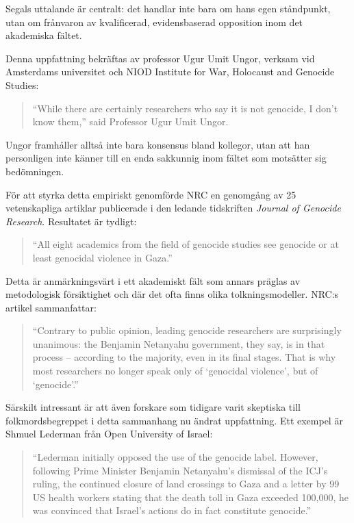 Segals uttalande är centralt: det handlar inte bara om hans egen ståndpunkt, utan om frånvaron av kvalificerad, evidensbaserad opposition inom det akademiska fältet.

Denna uppfattning bekräftas av professor Ugur Umit Ungor, verksam vid Amsterdams universitet och NIOD Institute for War, Holocaust and Genocide Studies:

\begin{quote}
“While there are certainly researchers who say it is not genocide, I don’t know them,” said Professor Ugur Umit Ungor.
\end{quote}

Ungor framhåller alltså inte bara konsensus bland kollegor, utan att han personligen inte känner till en enda sakkunnig inom fältet som motsätter sig bedömningen.

För att styrka detta empiriskt genomförde NRC en genomgång av 25 vetenskapliga artiklar publicerade i den ledande tidskriften \textit{Journal of Genocide Research}. Resultatet är tydligt:

\begin{quote}
“All eight academics from the field of genocide studies see genocide or at least genocidal violence in Gaza.”
\end{quote}

Detta är anmärkningsvärt i ett akademiskt fält som annars präglas av metodologisk försiktighet och där det ofta finns olika tolkningsmodeller. NRC:s artikel sammanfattar:

\begin{quote}
“Contrary to public opinion, leading genocide researchers are surprisingly unanimous: the Benjamin Netanyahu government, they say, is in that process – according to the majority, even in its final stages. That is why most researchers no longer speak only of ‘genocidal violence’, but of ‘genocide’.”
\end{quote}

Särskilt intressant är att även forskare som tidigare varit skeptiska till folkmordsbegreppet i detta sammanhang nu ändrat uppfattning. Ett exempel är Shmuel Lederman från Open University of Israel:

\begin{quote}
“Lederman initially opposed the use of the genocide label. However, following Prime Minister Benjamin Netanyahu’s dismissal of the ICJ’s ruling, the continued closure of land crossings to Gaza and a letter by 99 US health workers stating that the death toll in Gaza exceeded 100,000, he was convinced that Israel’s actions do in fact constitute genocide.”
\end{quote}

